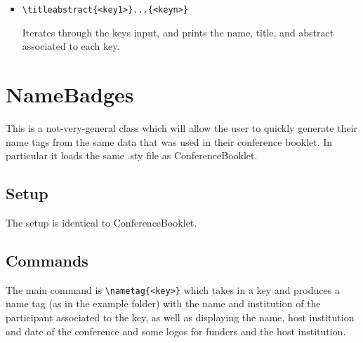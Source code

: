 \documentclass{amsart}
\begin{document}
\begin{itemize}
    Starts a table to be used for the participant list.  This table will have 3 columns.  \verb|<width_1>| is the width of the column for names;\verb|<width_2>| is the width of the column for email addresses;\verb|<width_3>| is the width of the columns for institutions.  Within this environment there main command is below.
    \begin{itemize}
        \item \verb|\participant{<key>}|

        Creates a row: the first entry is the \verb|name| associated to \verb|<key>|; the second is the \verb|email| associated to \verb|<key>|; the third is the \verb|institution| associated to \verb|<key>|.
    \end{itemize}
    \item \verb|\titleabstract{<key1>}...{<keyn>}|

        Iterates through the keys input, and prints the name, title, and abstract associated to each key.
\end{itemize}

\section{NameBadges}

This is a not-very-general class which will allow the user to quickly generate their name tags from the same data that was used in their conference booklet.  In particular it loads the same .sty file as ConferenceBooklet.
        
\subsection{Setup}
The setup is identical to ConferenceBooklet.
\subsection{Commands}
The main command is \verb|\nametag{<key>}| which takes in a key and produces a name tag (as in the example folder) with the name and institution of the participant associated to the key, as well as displaying the name, host institution and date of the conference and some logos for funders and the host institution.
\end{document}
